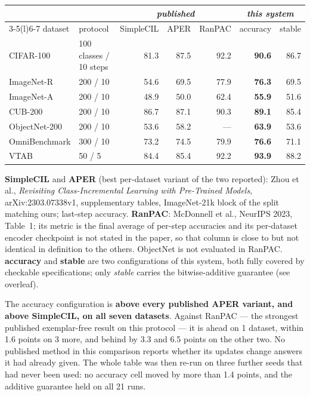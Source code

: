 \documentclass[11pt,a4paper]{article}
\begin{document}
\vspace{0.2em}
\begin{tabular}{@{}llrrr@{\hspace{1.6em}}rr@{}}
\toprule
& & \multicolumn{3}{c}{\emph{published}} & \multicolumn{2}{c}{\emph{this system}}\\
\cmidrule(r){3-5}\cmidrule(l){6-7}
dataset & protocol & SimpleCIL & APER & RanPAC & accuracy & stable\\
\midrule
CIFAR-100 & 100 classes / 10 steps & 81.3 & 87.5 & 92.2 & \textbf{90.6} & 86.7 \\
ImageNet-R & 200 / 10 & 54.6 & 69.5 & 77.9 & \textbf{76.3} & 69.5 \\
ImageNet-A & 200 / 10 & 48.9 & 50.0 & 62.4 & \textbf{55.9} & 51.6 \\
CUB-200 & 200 / 10 & 86.7 & 87.1 & 90.3 & \textbf{89.1} & 85.4 \\
ObjectNet-200 & 200 / 10 & 53.6 & 58.2 & --- & \textbf{63.9} & 53.6 \\
OmniBenchmark & 300 / 10 & 73.2 & 74.5 & 79.9 & \textbf{76.6} & 71.1 \\
VTAB & 50 / 5 & 84.4 & 85.4 & 92.2 & \textbf{93.9} & 88.2 \\
\bottomrule
\end{tabular}

\vspace{0.35em}
{\footnotesize\color{muted}
\textbf{SimpleCIL} and \textbf{APER} (best per-dataset variant of the two
reported): Zhou et al., \emph{Revisiting Class-Incremental Learning with
Pre-Trained Models}, arXiv:2303.07338v1, supplementary tables, ImageNet-21k
block of the split matching ours; last-step accuracy. \textbf{RanPAC}:
McDonnell et al., NeurIPS 2023, Table~1; its metric is the final average of
per-step accuracies and its per-dataset encoder checkpoint is not stated in the
paper, so that column is close to but not identical in definition to the others.
ObjectNet is not evaluated in RanPAC. \textbf{accuracy} and \textbf{stable} are
two configurations of this system, both fully covered by checkable
specifications; only \emph{stable} carries the bitwise-additive guarantee (see
overleaf).}

\vspace{0.5em}
The accuracy configuration is \textbf{above every published APER variant, and
above SimpleCIL, on all seven datasets}. Against
RanPAC --- the strongest published exemplar-free result on this protocol --- it
is ahead on 1 dataset, within 1.6 points on
3 more, and behind by 3.3 and 6.5 points on the other two. No published
method in this comparison reports whether its updates change answers it had
already given. The whole table was then re-run on three further seeds that had
never been used: no accuracy cell moved by more than 1.4 points, and the
additive guarantee held on all 21 runs.
\end{document}
